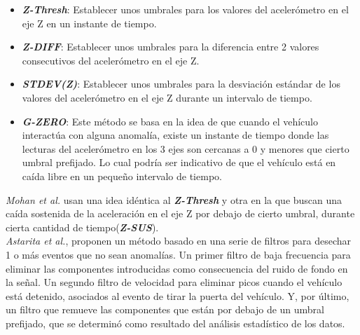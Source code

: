 		\begin{itemize}
			\item  \emph{\textbf {Z-Thresh}}: Establecer unos umbrales para los valores del acelerómetro en el eje Z en un instante de tiempo.\\
			\item \emph{\textbf {Z-DIFF}}: Establecer unos umbrales para la diferencia entre 2 valores consecutivos del acelerómetro en el eje Z.\\
			\item \emph{\textbf {STDEV(Z)}}: Establecer unos umbrales para la desviación estándar de los valores del acelerómetro en
				el eje Z durante un intervalo de tiempo.\\ 
			\item \emph{\textbf {G-ZERO}}: Este método se basa en la idea de que cuando el vehículo interactúa con alguna anomalía, existe un
				instante de tiempo donde las lecturas del acelerómetro en los 3 ejes son cercanas a 0 y menores que cierto umbral prefijado. Lo 
				cual podría ser indicativo de que el vehículo está en caída libre en un pequeño intervalo de tiempo.
		\end{itemize}

		\emph{Mohan et al.} usan una idea idéntica al \emph{\textbf{Z-Thresh}} y otra en la que buscan
		una caída sostenida de la aceleración en el eje Z por debajo de cierto umbral, durante cierta cantidad de tiempo(\emph{\textbf{Z-SUS}}).\\

		\emph{Astarita et al.}, proponen un método basado en una serie de filtros para desechar 1 o más eventos que
		no sean anomalías. Un primer filtro de baja frecuencia para eliminar las componentes introducidas como consecuencia del ruido de fondo en la señal.
		Un segundo filtro de velocidad para eliminar picos cuando el vehículo está detenido, asociados al evento de tirar la puerta del vehículo. Y, por 
		último, un filtro que remueve las componentes que están por debajo de un umbral prefijado, que se determinó como resultado del análisis estadístico
		de los datos. 


